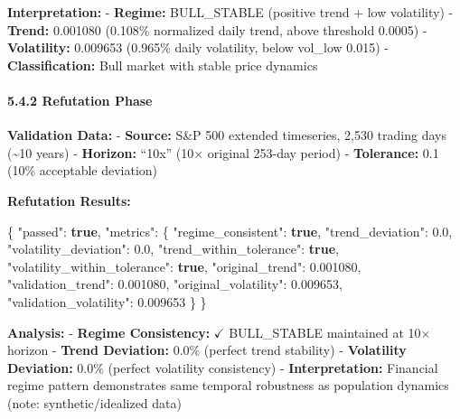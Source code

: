 \documentclass[
]{article}
\newenvironment{Shaded}{}{}
\newcommand{\DataTypeTok}[1]{\textcolor[rgb]{0.56,0.13,0.00}{#1}}
\newcommand{\FloatTok}[1]{\textcolor[rgb]{0.25,0.63,0.44}{#1}}
\newcommand{\FunctionTok}[1]{\textcolor[rgb]{0.02,0.16,0.49}{#1}}
\newcommand{\KeywordTok}[1]{\textcolor[rgb]{0.00,0.44,0.13}{\textbf{#1}}}
\begin{document}
\textbf{Interpretation:} - \textbf{Regime:} BULL\_STABLE (positive trend
+ low volatility) - \textbf{Trend:} 0.001080 (0.108\% normalized daily
trend, above threshold 0.0005) - \textbf{Volatility:} 0.009653 (0.965\%
daily volatility, below vol\_low 0.015) - \textbf{Classification:} Bull
market with stable price dynamics

\paragraph{5.4.2 Refutation Phase}\label{refutation-phase-1}

\textbf{Validation Data:} - \textbf{Source:} S\&P 500 extended
timeseries, 2,530 trading days (\textasciitilde10 years) -
\textbf{Horizon:} ``10x'' (10× original 253-day period) -
\textbf{Tolerance:} 0.1 (10\% acceptable deviation)

\textbf{Refutation Results:}

\begin{Shaded}
\begin{Highlighting}[]
\FunctionTok{\{}
  \DataTypeTok{"passed"}\FunctionTok{:} \KeywordTok{true}\FunctionTok{,}
  \DataTypeTok{"metrics"}\FunctionTok{:} \FunctionTok{\{}
    \DataTypeTok{"regime\_consistent"}\FunctionTok{:} \KeywordTok{true}\FunctionTok{,}
    \DataTypeTok{"trend\_deviation"}\FunctionTok{:} \FloatTok{0.0}\FunctionTok{,}
    \DataTypeTok{"volatility\_deviation"}\FunctionTok{:} \FloatTok{0.0}\FunctionTok{,}
    \DataTypeTok{"trend\_within\_tolerance"}\FunctionTok{:} \KeywordTok{true}\FunctionTok{,}
    \DataTypeTok{"volatility\_within\_tolerance"}\FunctionTok{:} \KeywordTok{true}\FunctionTok{,}
    \DataTypeTok{"original\_trend"}\FunctionTok{:} \FloatTok{0.001080}\FunctionTok{,}
    \DataTypeTok{"validation\_trend"}\FunctionTok{:} \FloatTok{0.001080}\FunctionTok{,}
    \DataTypeTok{"original\_volatility"}\FunctionTok{:} \FloatTok{0.009653}\FunctionTok{,}
    \DataTypeTok{"validation\_volatility"}\FunctionTok{:} \FloatTok{0.009653}
  \FunctionTok{\}}
\FunctionTok{\}}
\end{Highlighting}
\end{Shaded}

\textbf{Analysis:} - \textbf{Regime Consistency:} $\checkmark$ BULL\_STABLE
maintained at 10× horizon - \textbf{Trend Deviation:} 0.0\% (perfect
trend stability) - \textbf{Volatility Deviation:} 0.0\% (perfect
volatility consistency) - \textbf{Interpretation:} Financial regime
pattern demonstrates same temporal robustness as population dynamics
(note: synthetic/idealized data)
\end{document}
